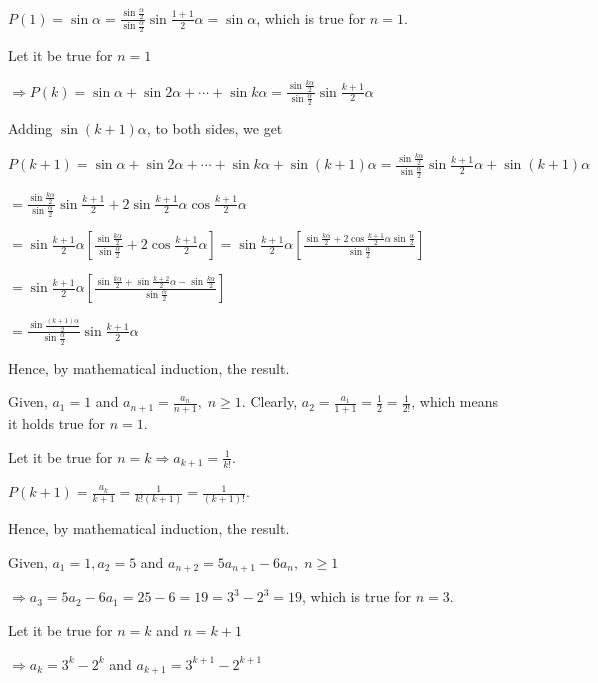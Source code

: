   $P(1) = \sin\alpha = \frac{\sin\frac{\alpha}{2}}{\sin\frac{\alpha}{2}}\sin\frac{1 + 1}{2}\alpha =
  \sin\alpha$, which is true for $n = 1$.

  Let it be true for $n = 1$

  $\Rightarrow P(k) = \sin\alpha + \sin2\alpha + \cdots + \sin k\alpha = \frac{\sin
    \frac{k\alpha}{2}}{\sin\frac{\alpha}{2}}\sin\frac{k + 1}{2}\alpha$

  Adding $\sin(k + 1)\alpha$, to both sides, we get

  $P(k + 1) = \sin\alpha + \sin2\alpha + \cdots + \sin k\alpha + \sin(k + 1)\alpha = \frac{\sin
    \frac{k\alpha}{2}}{\sin\frac{\alpha}{2}}\sin\frac{k + 1}{2}\alpha + \sin(k + 1)\alpha$

  $= \frac{\sin\frac{k\alpha}{2}}{\sin\frac{\alpha}{2}}\sin\frac{k + 1}{2} + 2\sin\frac{k + 1}{2}\alpha\cos\frac{k
    + 1}{2}\alpha$

  $= \sin\frac{k + 1}{2}\alpha\left[\frac{\sin\frac{k\alpha}{2}}{\sin\frac{\alpha}{2}} + 2\cos\frac{k +
      1}{2}\alpha\right] = \sin\frac{k + 1}{2}\alpha\left[\frac{\sin\frac{k\alpha}{2} + 2\cos\frac{k +
        1}{2}\alpha\sin\frac{\alpha}{2}}{\sin\frac{\alpha}{2}}\right]$

  $= \sin\frac{k + 1}{2}\alpha\left[\frac{\sin\frac{k\alpha}{2} + \sin\frac{k +
        2}{2}\alpha - \sin\frac{k\alpha}{2}}{\sin\frac{\alpha}{2}}\right]$

  $= \frac{\sin\frac{(k + 1)\alpha}{2}}{\sin\frac{\alpha}{2}}\sin\frac{k + 1}{2}\alpha$

  Hence, by mathematical induction, the result.
\item Given, $a_1 = 1$ and $a_{n + 1} = \frac{a_n}{n + 1},\;n\geq 1$. Clearly, $a_2 = \frac{a_1}{1 + 1} =
  \frac{1}{2} = \frac{1}{2!}$, which means it holds true for $n = 1$.

  Let it be true for $n = k\Rightarrow a_{k + 1} = \frac{1}{k!}$.

  $P(k + 1) = \frac{a_k}{k + 1} = \frac{1}{k!(k + 1)} = \frac{1}{(k + 1)!}$.

  Hence, by mathematical induction, the result.
\item Given, $a_1 = 1, a_2 = 5$ and $a_{n + 2} = 5a_{n + 1} - 6a_n,\;n\geq 1$

  $\Rightarrow a_3 = 5a_2 - 6a_1 = 25 - 6 = 19 = 3^3 - 2^3 = 19$, which is true for $n = 3$.

  Let it be true for $n = k$ and $n = k + 1$

  $\Rightarrow a_k = 3^k - 2^k$ and $a_{k + 1} = 3^{k + 1} - 2^{k + 1}$

